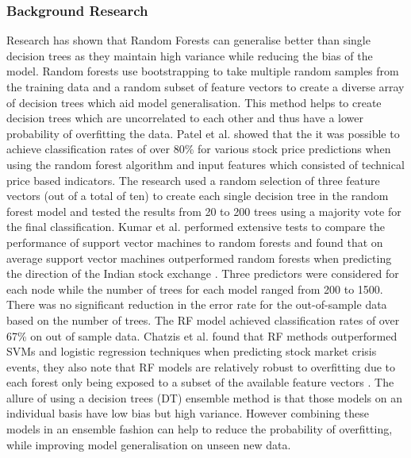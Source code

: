 \documentclass[11pt]{article}
\begin{document}
\subsubsection{Background Research}
Research has shown that Random Forests can generalise better than single decision trees as they maintain high variance while reducing the bias of the model\cite{Genuer2012}.
 Random forests use bootstrapping to take multiple random samples from the training data and a random subset of feature vectors to create a diverse array of decision trees which aid model generalisation. This method helps to create decision trees which are uncorrelated to each other and thus have a lower probability of overfitting the data. Patel et al. showed that the it was possible to achieve classification rates of over 80\% for various stock price predictions when using the random forest algorithm and input features which consisted of technical price based indicators\cite{Patel2015}. The research used a random selection of three feature vectors (out of a total of ten) to create each single decision tree in the random forest model and tested the results from 20 to 200 trees using a majority vote for the final classification.  \newline
Kumar et al. performed extensive tests to compare the performance of support vector machines to random forests and found that on average support vector machines outperformed random forests when predicting the direction of the Indian stock exchange \cite{Kumar2006}. Three predictors were considered for each node while the number of trees for each model ranged from 200 to 1500. There was no significant reduction in the error rate for the out-of-sample data based on the number of trees. The RF model achieved classification rates of over 67\% on out of sample data.\newline
Chatzis et al. found that RF methods outperformed SVMs and logistic regression techniques when predicting stock market crisis events, they also note that RF models are relatively robust to overfitting due to each forest only being exposed to a subset of the available feature vectors \cite{Chatzis2018}.
The allure of using a decision trees (DT) ensemble method is that those models on an individual basis have low bias but high variance. However combining these models in an ensemble fashion can help to reduce the probability of overfitting, while improving model generalisation on unseen new data.
 
\end{document}
